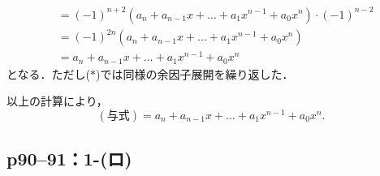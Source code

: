 \begin{tanswer}
\begin{align*}
                & = (-1)^{n+2} (a_n + a_{n-1} x + \dots +a_1 x^{n-1} + a_0 x^n) \cdot (-1)^{n-2}                                                                     \\
                & = (-1)^{2n} (a_n + a_{n-1} x + \dots +a_1 x^{n-1} + a_0 x^n)                                                                                       \\
                & = a_n + a_{n-1} x + \dots +a_1 x^{n-1} + a_0 x^n
  \end{align*}
  となる．ただし($\ast$)では同様の余因子展開を繰り返した．

  以上の計算により，
  \[
    (\text{与式}) = a_n + a_{n-1} x + \dots +a_1 x^{n-1} + a_0 x^n.
  \]
\end{tanswer}


\subsection*{p90--91：1-(ロ)}

